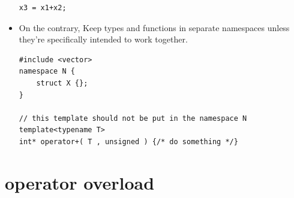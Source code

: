 \documentclass[a4paper,11pt,twoside]{book}
\begin{document}
\begin{itemize}
\begin{lstlisting}[numbers=none]
x3 = x1+x2;
\end{lstlisting}
	
	\item On the contrary, Keep types and functions in separate namespaces unless they're specifically intended to work together.
	
\begin{lstlisting}[numbers=none]
#include <vector>
namespace N {
	struct X {};
}

// this template should not be put in the namespace N
template<typename T>
int* operator+( T , unsigned ) {/* do something */}
\end{lstlisting}
\end{itemize}


\section{operator overload}
\end{document}
